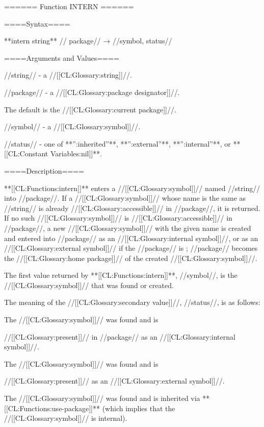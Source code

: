 ====== Function INTERN ======

====Syntax====

**intern {string** //\opt} package// → //symbol, status//

====Arguments and Values====

//string// - a //[[CL:Glossary:string]]//.

//package// - a //[[CL:Glossary:package designator]]//.

The default is the //[[CL:Glossary:current package]]//.

//symbol// - a //[[CL:Glossary:symbol]]//.

//status// - one of **'':inherited''**, **'':external''**, **'':internal''**, or **[[CL:Constant Variables:nil]]**.

====Description====

**[[CL:Functions:intern]]** enters a //[[CL:Glossary:symbol]]// named //string// into //package//. If a //[[CL:Glossary:symbol]]// whose name is the same as //string// is already //[[CL:Glossary:accessible]]// in //package//, it is returned. If no such //[[CL:Glossary:symbol]]// is //[[CL:Glossary:accessible]]// in //package//, a new //[[CL:Glossary:symbol]]// with the given name is created and entered into //package// as an //[[CL:Glossary:internal symbol]]//, or as an //[[CL:Glossary:external symbol]]// if the //package// is ; //package// becomes the //[[CL:Glossary:home package]]// of the created //[[CL:Glossary:symbol]]//.

The first value returned by **[[CL:Functions:intern]]**, //symbol//, is the //[[CL:Glossary:symbol]]// that was found or created.

The meaning of the //[[CL:Glossary:secondary value]]//, //status//, is as follows: \beginlist {}

The //[[CL:Glossary:symbol]]// was found and is

//[[CL:Glossary:present]]// in //package// as an //[[CL:Glossary:internal symbol]]//.


The //[[CL:Glossary:symbol]]// was found and is

//[[CL:Glossary:present]]// as an //[[CL:Glossary:external symbol]]//.


The //[[CL:Glossary:symbol]]// was found and is inherited via **[[CL:Functions:use-package]]** (which implies that the //[[CL:Glossary:symbol]]// is internal).

